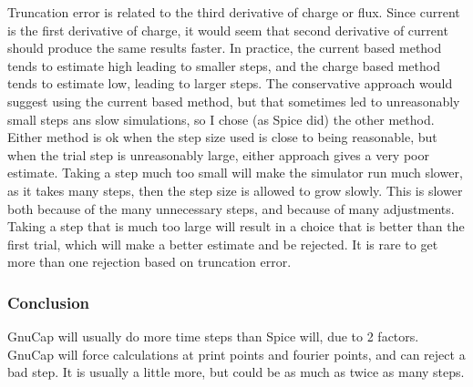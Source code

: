 Truncation error is related to the third derivative of charge or flux.
Since current is the first derivative of charge, it would seem that
second derivative of current should produce the same results faster.
In practice, the current based method tends to estimate high leading
to smaller steps, and the charge based method tends to estimate low,
leading to larger steps.  The conservative approach would suggest
using the current based method, but that sometimes led to unreasonably
small steps ans slow simulations, so I chose (as Spice did) the other
method.  Either method is ok when the step size used is close to being
reasonable, but when the trial step is unreasonably large, either
approach gives a very poor estimate.  Taking a step much too small
will make the simulator run much slower, as it takes many steps, then
the step size is allowed to grow slowly.  This is slower both because
of the many unnecessary steps, and because of many adjustments.
Taking a step that is much too large will result in a choice that is
better than the first trial, which will make a better estimate and be
rejected.  It is rare to get more than one rejection based on
truncation error.

\subsubsection{Conclusion}

GnuCap will usually do more time steps than Spice will, due to 2 factors.
GnuCap will force calculations at print points and fourier points, and
can reject a bad step.  It is usually a little more, but could be as
much as twice as many steps.
